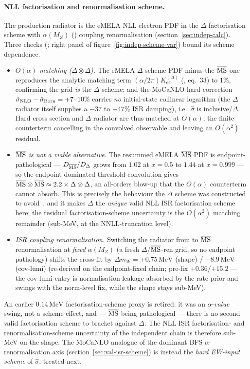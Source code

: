\documentclass[11pt,a4paper]{article}
\newcommand{\code}[1]{\texttt{\detokenize{#1}}}
\newcommand{\mW}{m_W}
\newcommand{\MeV}{\ensuremath{\,\mathrm{MeV}}}
\begin{document}
\paragraph{NLL factorisation and renormalisation scheme.} The production radiator
is the eMELA NLL electron PDF in the $\Delta$ factorisation scheme with
$\alpha(M_Z)$ (\code{ALPMZ}) coupling renormalisation (section~\ref{sec:indep-calc}).
Three checks (\code{scripts/investigations/nll_isr/}; right panel of
figure~\ref{fig:indep-scheme-var}) bound its scheme dependence.
\begin{itemize}
\item \emph{$O(\alpha)$ matching ($\Delta\otimes\Delta$).} The eMELA $\Delta$-scheme
  PDF minus the $\overline{\rm MS}$ one reproduces the analytic matching term
  $(\alpha/2\pi)K_{ee}^{(\Delta)}$ (\cite{eMELAdelta}, eq.~33) to $1\%$, confirming
  the grid \emph{is} the $\Delta$ scheme; and the MoCaNLO hard correction
  $\hat\sigma_{\rm NLO}-\hat\sigma_{\rm Born}=+7$--$10\%$ carries \emph{no}
  initial-state collinear logarithm (the $\Delta$ radiator itself supplies a
  $-37$ to $-47\%$ ISR damping), i.e.\ $\hat\sigma$ is inclusive/$\Delta$. Hard
  cross section and $\Delta$ radiator are thus matched at $O(\alpha)$, the finite
  counterterm cancelling in the convolved observable and leaving an $O(\alpha^2)$
  residual.
\item \emph{$\overline{\rm MS}$ is not a viable alternative.} The resummed eMELA
  $\overline{\rm MS}$ PDF is endpoint-pathological --- $D_{\overline{\rm MS}}/D_\Delta$
  grows from $1.02$ at $x=0.5$ to $1.44$ at $x=0.999$ --- so the endpoint-dominated
  threshold convolution gives $\overline{\rm MS}\otimes\overline{\rm MS}\approx
  2.2\times\Delta\otimes\Delta$, an all-orders blow-up that the $O(\alpha)$
  counterterm cannot absorb. This is precisely the behaviour the $\Delta$ scheme
  was constructed to avoid~\cite{eMELAdelta}, and it makes $\Delta$ the
  \emph{unique} valid NLL ISR factorisation scheme here; the residual
  factorisation-scheme uncertainty is the $O(\alpha^2)$ matching remainder
  (sub-MeV, at the NNLL-truncation level).
\item \emph{ISR coupling renormalisation.} Switching the radiator from
  \code{ALPMZ} to $\overline{\rm MS}$ renormalisation at \emph{fixed} $\alpha(M_Z)$
  (a fresh $\Delta$/$\overline{\rm MS}$-ren grid, so no endpoint pathology) shifts
  the cross-fit by $\Delta\mW=+0.75\MeV$ (shape) / $-8.9\MeV$ (cov-lumi)
  (re-derived on the endpoint-fixed chain; pre-fix $+0.36$/$+15.2$ --- the
  cov-lumi entry is normalisation leakage absorbed by the rate prior and
  swings with the norm-level fix, while the shape stays sub-MeV).
\end{itemize}
An earlier $0.14\MeV$ factorisation-scheme proxy is retired: it was an
$\alpha$-\emph{value} swing, not a scheme effect, and --- $\overline{\rm MS}$ being
pathological --- there is no second valid factorisation scheme to bracket against
$\Delta$. The NLL ISR factorisation- and renormalisation-scheme uncertainty of the
independent chain is therefore sub-MeV on the shape. The MoCaNLO analogue of the
dominant BFS $\alpha$-renormalisation axis (section~\ref{sec:val-isr-scheme}) is
instead the \emph{hard EW-input scheme} of $\hat\sigma$, treated next.
\end{document}
